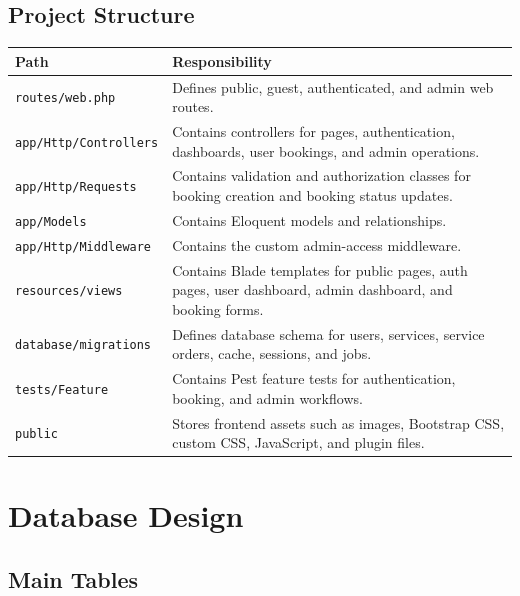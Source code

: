 \documentclass[12pt,a4paper]{report}
\begin{document}
\section{Project Structure}

\begin{longtable}{L{0.33\textwidth} L{0.57\textwidth}}
\toprule
\textbf{Path} & \textbf{Responsibility} \\
\midrule
\texttt{routes/web.php} & Defines public, guest, authenticated, and admin web routes. \\
\texttt{app/Http/Controllers} & Contains controllers for pages, authentication, dashboards, user bookings, and admin operations. \\
\texttt{app/Http/Requests} & Contains validation and authorization classes for booking creation and booking status updates. \\
\texttt{app/Models} & Contains Eloquent models and relationships. \\
\texttt{app/Http/Middleware} & Contains the custom admin-access middleware. \\
\texttt{resources/views} & Contains Blade templates for public pages, auth pages, user dashboard, admin dashboard, and booking forms. \\
\texttt{database/migrations} & Defines database schema for users, services, service orders, cache, sessions, and jobs. \\
\texttt{tests/Feature} & Contains Pest feature tests for authentication, booking, and admin workflows. \\
\texttt{public} & Stores frontend assets such as images, Bootstrap CSS, custom CSS, JavaScript, and plugin files. \\
\bottomrule
\end{longtable}

\chapter{Database Design}

\section{Main Tables}
\end{document}
